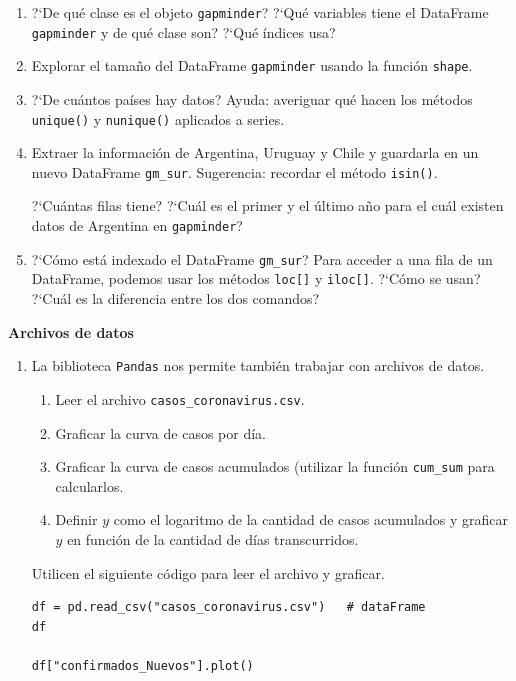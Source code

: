 \documentclass[a4paper,11pt]{article}
\theoremstyle{definition}
\begin{document}
\begin{enumerate}[resume]
\item ?`De qu\'e clase es el objeto \lstinline{gapminder}? ?`Qu\'e variables tiene el DataFrame \lstinline{gapminder} y de qu\'e clase son? ?`Qu\'e \'indices usa?

\item Explorar el tama\~no del DataFrame \lstinline{gapminder} usando la funci\'on \lstinline{shape}.

\item ?`De cu\'antos pa\'ises hay datos? Ayuda: averiguar qu\'e hacen los m\'etodos \lstinline{unique()} y \lstinline{nunique()} aplicados a series.



\item Extraer la informaci\'on de Argentina, Uruguay y Chile y guardarla en un nuevo DataFrame \lstinline{gm_sur}. Sugerencia: recordar el m\'etodo \lstinline{isin()}.

?`Cu\'antas filas tiene? ?`Cu\'al es el primer y el \'ultimo a\~no para el cu\'al existen datos de Argentina en \lstinline{gapminder}?

\item ?`C\'omo est\'a indexado el DataFrame \lstinline{gm_sur}? Para acceder a una fila de un DataFrame, podemos usar los m\'etodos \lstinline{loc[]} y \lstinline{iloc[]}. ?`C\'omo se usan? ?`Cu\'al es la diferencia entre los dos comandos?


\end{enumerate}

\textbf{\large Archivos de datos}

\begin{enumerate}[resume]
\item La biblioteca \lstinline{Pandas} nos permite tambi\'en trabajar con archivos de datos.

\begin{enumerate}
\item Leer el archivo \lstinline{casos_coronavirus.csv}.
\item Graficar la curva de casos por d\'ia.
\item Graficar la curva de casos acumulados (utilizar la funci\'on \lstinline{cum_sum} para calcularlos.
\item Definir $y$ como el logaritmo de la cantidad de casos acumulados y graficar $y$ en funci\'on de la cantidad de d\'ias transcurridos.
\end{enumerate}
Utilicen el siguiente c\'odigo para leer el archivo y graficar.

\begin{lstlisting}
df = pd.read_csv("casos_coronavirus.csv")   # dataFrame
df

df["confirmados_Nuevos"].plot()
\end{lstlisting}

\end{enumerate}
\end{document}
